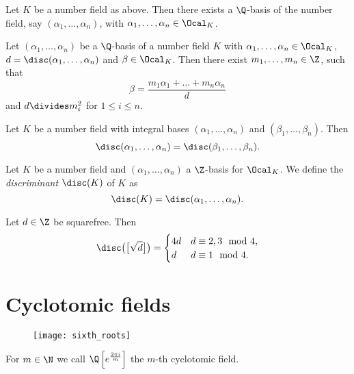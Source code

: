
\begin{lem}
	Let \( K \) be a number field as above.
	Then there exists a \( \Q \)-basis of the number field, say \( (\alpha_1, \dotsc, \alpha_n) \), with \( \alpha_1, \dotsc, \alpha_n \in \Ocal_K \).
\end{lem}

\begin{prop}
	Let \( (\alpha_1, \dotsc, \alpha_n) \) be a \( \Q \)-basis of a number field \( K \) with \( \alpha_1, \dotsc, \alpha_n \in \Ocal_K \), \( d = \disc(\alpha_1, \dotsc, \alpha_n) \) and \( \beta \in \Ocal_K \).
	Then there exist \( m_1, \dotsc, m_n \in \Z \), such that
	\[ \beta = \frac{m_1\alpha_1 + \dots + m_n\alpha_n}{d} \]
	and \( d \divides m_i^2 \) for \( 1 \leq i \leq n \).
\end{prop}

\begin{lem}
	Let \( K \) be a number field with integral bases \( (\alpha_1, \dotsc, \alpha_n) \) and \( (\beta_1, \dotsc, \beta_n) \).
	Then
	\[ \disc(\alpha_1, \dotsc, \alpha_n) = \disc(\beta_1, \dotsc, \beta_n). \]
\end{lem}

\begin{defn*}[Discriminant of \( K \)]
	Let \( K \) be a number field and \( (\alpha_1, \dotsc, \alpha_n) \) a \( \Z \)-basis for \( \Ocal_K \).
	We define the \emph{discriminant} \( \disc(K) \) of \( K \) as
	\[ \disc(K) = \disc(\alpha_1, \dotsc, \alpha_n). \]
\end{defn*}

\begin{exmp*}
	Let \( d \in \Z \) be squarefree. Then
	\[ \disc\big(\big[\sqrt{d}\big]\big) = \begin{cases}
		4d &d \equiv 2,3 \mod 4,\\
		d &d \equiv 1 \mod 4.
	\end{cases} \]
\end{exmp*}


\section{Cyclotomic fields}

\begin{wrapfigure}{R}{2cm}
	\texttt{[image: sixth\_roots]}
\end{wrapfigure}

\begin{defn*}
	For \( m \in \N \) we call \( \Q \left[ e^\frac{2\pi i}{m} \right] \) the \( m \)-th cyclotomic field.
\end{defn*}

